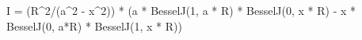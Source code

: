 I = (R^2/(a^2 - x^2)) * (a * BesselJ(1, a * R) * BesselJ(0, x * R) - x * BesselJ(0, a*R) * BesselJ(1, x * R))
